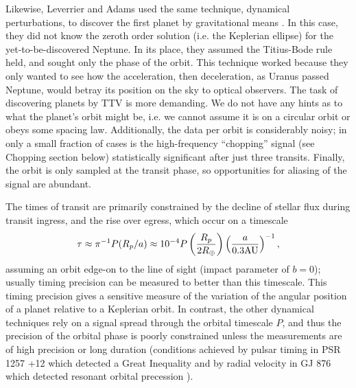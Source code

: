 \documentclass[graybox,natbib,nosecnum]{svmult}
\begin{document}
Likewise, Leverrier and Adams used the same technique, dynamical perturbations, to discover the first planet by gravitational means \citep{Adams1847,LeVerrier1877}. In this case, they did not know the zeroth order solution (i.e. the Keplerian ellipse) for the yet-to-be-discovered Neptune.  In its place, they assumed the Titius-Bode rule held, and sought only the phase of the orbit.  This technique worked because they only wanted to see how the acceleration, then deceleration, as Uranus passed Neptune, would betray its position on the sky to optical observers. The task of discovering planets by TTV is more demanding.  We do not have any hints as to what the planet's orbit might be, i.e. we cannot assume it is on a circular orbit or obeys some spacing law.  Additionally, the data per orbit is considerably noisy; in only a small fraction of cases is the high-frequency ``chopping'' signal (see Chopping section below) statistically significant after just three transits. Finally, the orbit is only sampled at the transit phase, so opportunities for aliasing of the signal are abundant.

The times of transit are primarily constrained by the decline of stellar flux during transit ingress, and the rise over egress, which occur on a timescale 
\begin{equation} \label{ingress}
\tau \approx \pi^{-1} P(R_p/a) \approx 10^{-4}P \left(\frac{R_p}{2 R_\oplus}\right) \left(\frac{a}{0.3 \rm{AU}}\right)^{-1},
\end{equation}  
assuming an orbit edge-on to the line of sight (impact parameter of $b=0$); usually timing precision can be measured to better than this timescale.
This timing precision gives a sensitive measure of the variation of the angular position of a planet relative to a Keplerian orbit.  In contrast, the other dynamical techniques rely on a signal spread through the orbital timescale $P$, and thus the precision of the orbital phase is poorly constrained unless the measurements are of high precision or long duration (conditions achieved by pulsar timing in PSR 1257 +12 which detected a Great Inequality \citep{1994Sci...264..538W} and by radial velocity in GJ 876 which detected resonant orbital precession \citep{2001Laughlin}).
\end{document}
